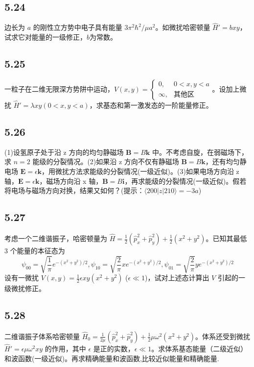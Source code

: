 \subsection{5.24}
边长为 $a$ 的刚性立方势中电子具有能量 $3\pi^2 \hbar^2 / \mu a^2$。如微扰哈密顿量 $\hat{H}' = bxy$，试求它对能量的一级修正，$b$为常数。

\subsection{5.25}
一粒子在二维无限深方势阱中运动，$V(x, y) = \begin{cases} 0, & 0 < x, y < a \\ \infty, & \text{其他区} \end{cases}$。设加上微扰 $\hat{H}' = \lambda xy (0 < x, y < a)$，求基态和第一激发态的一阶能量修正。

\subsection{5.26}
(1)设氢原子处于沿 z 方向的均匀静磁场 $\mathbf{B} = B \mathbf{k}$ 中。不考虑自旋，在弱磁场下，求 $n = 2$ 能级的分裂情况。(2)如果沿 z 方向不仅有静磁场 $\mathbf{B} = B \mathbf{k}$，还有均匀静电场 $\mathbf{E} = \epsilon \mathbf{k}$，用微扰方法求能级的分裂情况(一级近似)。(3)如果电场方向沿 z 轴，$\mathbf{E} = \epsilon \mathbf{k}$，磁场方向沿 x 轴，$\mathbf{B} = B \mathbf{i}$，再求能级的分裂情况(一级近似)。假若将电场与磁场方向对换，结果又如何？(提示：$\langle 200|z|210\rangle = -3a$)

\subsection{5.27}
考虑一个二维谐振子，哈密顿量为 $\hat{H} = \frac{1}{2} (\hat{p}_x^2 + \hat{p}_y^2) + \frac{1}{2} (x^2 + y^2)$。已知其最低 3 个能量的本征态为
$$\psi_{00} = \sqrt{\frac{1}{\pi}} e^{-(x^2 + y^2)/2}, \psi_{10} = \sqrt{\frac{2}{\pi}} x e^{-(x^2 + y^2)/2}, \psi_{01} = \sqrt{\frac{2}{\pi}} y e^{-(x^2 + y^2)/2}$$
设有一微扰 $V(x, y) = \frac{1}{2} \epsilon x y (x^2 + y^2)$ ($\epsilon \ll 1$)，试对上述态计算出 $V$ 引起的一级微扰修正。

\subsection{5.28}
二维谐振子体系哈密顿量 $\hat{H}_0 = \frac{1}{2\mu} (\hat{p}^2_x + \hat{p}^2_y) + \frac{1}{2}\mu\omega^2 (x^2 + y^2)$。体系还受到微扰 $\hat{H}' = \epsilon \mu \omega^2 x y$ 的作用，其中 $\epsilon$ 是正的实数，$\epsilon \ll 1$。求体系基态能量（二级近似）和波函数(一级近似)。再求精确能量和波函数,比较近似能量和精确能量.

